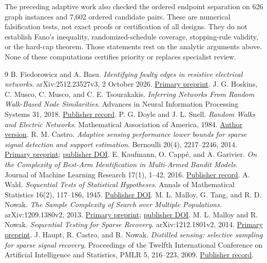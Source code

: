 \documentclass[11pt,letterpaper]{article}
\begin{document}
The preceding adaptive work also checked the ordered endpoint separation on 626 graph instances and 7,602 ordered candidate pairs. These are numerical falsification tests, not exact proofs or certification of all designs. They do not establish Fano's inequality, randomized-schedule coverage, stopping-rule validity, or the hard-cap theorem. Those statements rest on the analytic arguments above. None of these computations certifies priority or replaces specialist review.

\begin{thebibliography}{9}
 B. Fiedorowicz and A. Basu. \emph{Identifying faulty edges in resistive electrical networks}. arXiv:2512.23527v3, 2 October 2026. \href{https://arxiv.org/abs/2512.23527v3}{Primary preprint}.
 J. G. Hoskins, C. Musco, C. Musco, and C. E. Tsourakakis. \emph{Inferring Networks From Random Walk-Based Node Similarities}. Advances in Neural Information Processing Systems 31, 2018. \href{https://papers.neurips.cc/paper_files/paper/2018/hash/2f25f6e326adb93c5787175dda209ab6-Abstract.html}{Publisher record}.
 P. G. Doyle and J. L. Snell. \emph{Random Walks and Electric Networks}. Mathematical Association of America, 1984. \href{https://math.dartmouth.edu/~doyle/docs/walkspdf/walks.pdf}{Author version}.
 R. M. Castro. \emph{Adaptive sensing performance lower bounds for sparse signal detection and support estimation}. Bernoulli 20(4), 2217--2246, 2014. \href{https://arxiv.org/abs/1206.0648}{Primary preprint}; \href{https://doi.org/10.3150/13-BEJ555}{publisher DOI}.
 E. Kaufmann, O. Capp\'e, and A. Garivier. \emph{On the Complexity of Best-Arm Identification in Multi-Armed Bandit Models}. Journal of Machine Learning Research 17(1), 1--42, 2016. \href{https://www.jmlr.org/beta/papers/v17/kaufman16a.html}{Publisher record}.
 A. Wald. \emph{Sequential Tests of Statistical Hypotheses}. Annals of Mathematical Statistics 16(2), 117--186, 1945. \href{https://doi.org/10.1214/aoms/1177731118}{Publisher DOI}.
 M. L. Malloy, G. Tang, and R. D. Nowak. \emph{The Sample Complexity of Search over Multiple Populations}. arXiv:1209.1380v2, 2013. \href{https://arxiv.org/abs/1209.1380}{Primary preprint}; \href{https://doi.org/10.1109/TIT.2013.2258071}{publisher DOI}.
 M. L. Malloy and R. Nowak. \emph{Sequential Testing for Sparse Recovery}. arXiv:1212.1801v2, 2014. \href{https://arxiv.org/abs/1212.1801}{Primary preprint}.
 J. Haupt, R. Castro, and R. Nowak. \emph{Distilled sensing: selective sampling for sparse signal recovery}. Proceedings of the Twelfth International Conference on Artificial Intelligence and Statistics, PMLR 5, 216--223, 2009. \href{https://proceedings.mlr.press/v5/haupt09a.html}{Publisher record}.
\end{thebibliography}
\end{document}

